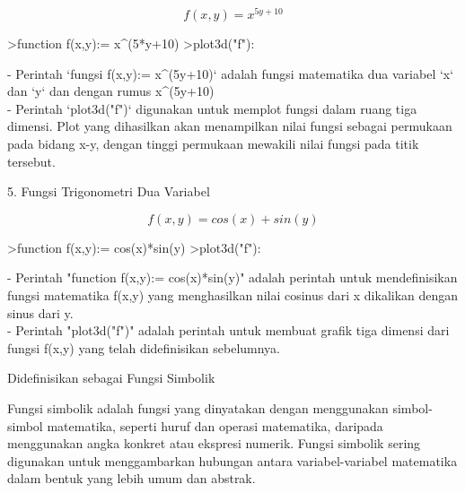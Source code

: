 \documentclass[a4paper,10pt]{article}
\begin{document}
\begin{eulernotebook}
\begin{eulercomment}
\begin{eulercomment}
\begin{eulercomment}
\begin{eulercomment}
\begin{eulercomment}
\begin{eulercomment}
\begin{eulercomment}
\begin{eulercomment}
\begin{eulercomment}
\end{eulercomment}
\begin{eulerformula}
\[
f(x,y)=x^{5y+10}
\]
\end{eulerformula}
\begin{eulerprompt}
>function f(x,y):= x^(5*y+10)
>plot3d("f"):
\end{eulerprompt}
\begin{eulercomment}
- Perintah `fungsi f(x,y):= x\textasciicircum{}(5y+10)` adalah fungsi matematika dua
variabel `x` dan `y` dan dengan rumus x\textasciicircum{}(5y+10)\\
- Perintah `plot3d("f")` digunakan untuk memplot fungsi dalam ruang
tiga dimensi. Plot yang dihasilkan akan menampilkan nilai fungsi
sebagai permukaan pada bidang x-y, dengan tinggi permukaan mewakili
nilai fungsi pada titik tersebut.

\end{eulercomment}
\eulersubheading{}
\begin{eulercomment}
5. Fungsi Trigonometri Dua Variabel

\end{eulercomment}
\begin{eulerformula}
\[
f(x,y)=cos(x)+sin(y)
\]
\end{eulerformula}
\begin{eulerprompt}
>function f(x,y):= cos(x)*sin(y)
>plot3d("f"):
\end{eulerprompt}
\begin{eulercomment}
- Perintah "function f(x,y):= cos(x)*sin(y)" adalah perintah untuk
mendefinisikan fungsi matematika f(x,y) yang menghasilkan nilai
cosinus dari x dikalikan dengan sinus dari y.\\
- Perintah "plot3d("f")" adalah perintah untuk membuat grafik tiga
dimensi dari fungsi f(x,y) yang telah didefinisikan sebelumnya.



\end{eulercomment}
\begin{eulercomment}
Didefinisikan sebagai Fungsi Simbolik

\end{eulercomment}
\begin{eulercomment}
Fungsi simbolik adalah fungsi yang dinyatakan dengan menggunakan
simbol-simbol matematika, seperti huruf dan operasi matematika,
daripada menggunakan angka konkret atau ekspresi numerik. Fungsi
simbolik sering digunakan untuk menggambarkan hubungan antara
variabel-variabel matematika dalam bentuk yang lebih umum dan abstrak.


\end{eulercomment}
\end{eulercomment}
\end{eulercomment}
\end{eulercomment}
\end{eulercomment}
\end{eulercomment}
\end{eulercomment}
\end{eulercomment}
\end{eulercomment}
\end{eulernotebook}
\end{document}
